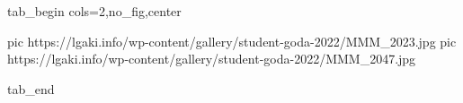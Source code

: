  
 
 
 
 


\ifcmt
  tab_begin cols=2,no_fig,center

     pic https://lgaki.info/wp-content/gallery/student-goda-2022/MMM_2023.jpg
		 pic https://lgaki.info/wp-content/gallery/student-goda-2022/MMM_2047.jpg

  tab_end
\fi
